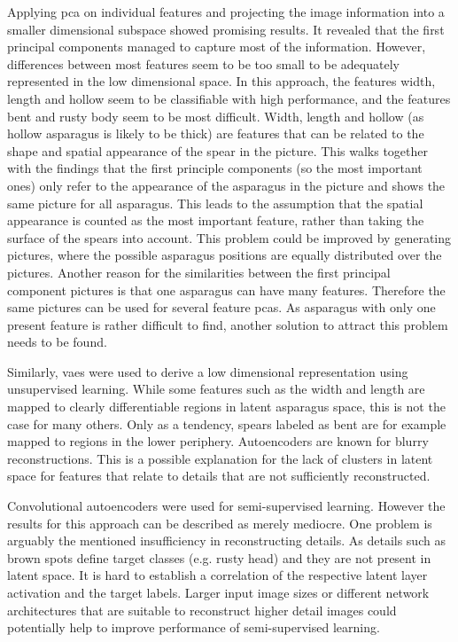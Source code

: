 \bigskip
Applying \acrshort{pca} on individual features and projecting the image information into a smaller dimensional subspace showed promising results. It revealed that the first principal components managed to capture most of the information. However, differences between most features seem to be too small to be adequately represented in the low dimensional space. In this approach, the features width, length and hollow seem to be classifiable with high performance, and the features bent and rusty body seem to be most difficult. Width, length and hollow (as hollow asparagus is likely to be thick) are features that can be related to the shape and spatial appearance of the spear in the picture. This walks together with the findings that the first principle components (so the most important ones) only refer to the appearance of the asparagus in the picture and shows the same picture for all asparagus. This leads to the assumption that the spatial appearance is counted as the most important feature, rather than taking the surface of the spears into account. This problem could be improved by generating pictures, where the possible asparagus positions are equally distributed over the pictures. Another reason for the similarities between the first principal component pictures is that one asparagus can have many features. Therefore the same pictures can be used for several feature pcas. As asparagus with only one present feature is rather difficult to find, another solution to attract this problem needs to be found.

\bigskip
Similarly, \acrlong{vae}s were used to derive a low dimensional representation using unsupervised learning. While some features such as the width and length are mapped to clearly differentiable regions in latent asparagus space, this is not the case for many others. Only as a tendency, spears labeled as bent are for example mapped to regions in the lower periphery. Autoencoders are known for blurry reconstructions. This is a possible explanation for the lack of clusters in latent space for features that relate to details that are not sufficiently reconstructed.

\bigskip
Convolutional autoencoders were used for semi-supervised learning. However the results for this approach can be described as merely mediocre. One problem is arguably the mentioned insufficiency in reconstructing details. As details such as brown spots define target classes (e.g. rusty head) and they are not present in latent space. It is hard to establish a correlation of the respective latent layer activation and the target labels. Larger input image sizes or different network architectures that are suitable to reconstruct higher detail images could potentially help to improve performance of semi-supervised learning.

